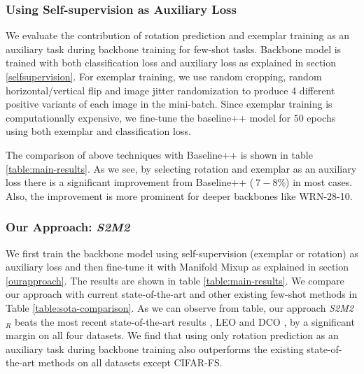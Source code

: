 \documentclass[10pt,twocolumn,letterpaper]{article}
\begin{document}
\subsubsection{Using Self-supervision as Auxiliary Loss}
We evaluate the contribution of rotation prediction \cite{Spyros2018rotate} and exemplar training \cite{exemplar2014} as an auxiliary task during backbone training for few-shot tasks. Backbone model is trained with both classification loss and auxiliary loss as explained in section \ref{selfsupervision}. For exemplar training, we use random cropping, random horizontal/vertical flip and image jitter randomization \cite{s4l2019} to produce 4 different positive variants of each image in the mini-batch. Since exemplar training is computationally expensive, we fine-tune the baseline++ model for $50$ epochs using both exemplar and classification loss.

The comparison of above techniques with Baseline++ is shown in table
\ref{table:main-results}. As we see, by selecting rotation and exemplar as an auxiliary loss there is a significant improvement from Baseline++ ($~7-8\%$) in most cases. Also, the improvement is more prominent for deeper backbones like WRN-28-10.

\vspace{-3pt}
\subsubsection{Our Approach: \textit{S2M2}}\label{results}
We first train the backbone model using self-supervision (exemplar or rotation) as auxiliary loss and then fine-tune it with Manifold Mixup as explained in section \ref{ourapproach}.
The results are shown in table \ref{table:main-results}. We compare our approach with current state-of-the-art \cite{leo2019, dco2019} and other existing few-shot methods \cite{snell2017prototypical, relation2017Sung} in Table \ref{table:sota-comparison}. As we can observe from table, our approach \textit{S2M2$_R$} beats the most recent state-of-the-art results , LEO \cite{leo2019} and DCO \cite{dco2019}, by a significant margin on all four datasets. We find that using only rotation prediction as an auxiliary task during backbone training also outperforms the existing state-of-the-art methods on all datasets except CIFAR-FS.
\end{document}
